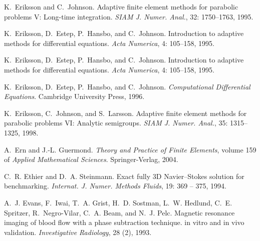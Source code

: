\begin{thebibliography}{467}
K.~Eriksson and C.~Johnson.
\newblock Adaptive finite element methods for parabolic problems {V}:
  {L}ong-time integration.
\newblock \emph{SIAM J. Numer. Anal.}, 32: 1750--1763,
  1995{}.

K.~Eriksson, D.~Estep, P.~Hansbo, and C.~Johnson.
\newblock Introduction to adaptive methods for differential equations.
\newblock \emph{Acta Numerica}, 4: 105--158, 1995{}.

K.~Eriksson, D.~Estep, P.~Hansbo, and C.~Johnson.
\newblock Introduction to adaptive methods for differential equations.
\newblock \emph{Acta Numerica}, 4: 105--158, 1995{}.

K.~Eriksson, D.~Estep, P.~Hansbo, and C.~Johnson.
\newblock \emph{Computational Differential Equations}.
\newblock Cambridge University Press, 1996.

K.~Eriksson, C.~Johnson, and S.~Larsson.
\newblock Adaptive finite element methods for parabolic problems {VI}:
  {A}nalytic semigroups.
\newblock \emph{SIAM J. Numer. Anal.}, 35: 1315--1325, 1998.

A.~Ern and J.-L. Guermond.
\newblock \emph{Theory and Practice of Finite Elements}, volume 159 of
  \emph{Applied Mathematical Sciences}.
\newblock Springer-Verlag, 2004.

C.~R. Ethier and D.~A. Steinmann.
\newblock Exact fully {3D} {N}avier--{S}tokes solution for benchmarking.
\newblock \emph{Internat. J. Numer. Methods Fluids}, 19: 369 -- 375,
  1994.

A.~J. Evans, F.~Iwai, T.~A. Grist, H.~D. Sostman, L.~W. Hedlund, C.~E.
  Spritzer, R.~Negro-Vilar, C.~A. Beam, and N.~J. Pelc.
\newblock Magnetic resonance imaging of blood flow with a phase subtraction
  technique. in vitro and in vivo validation.
\newblock \emph{Investigative Radiology}, 28 (2), 1993.


\end{thebibliography}
